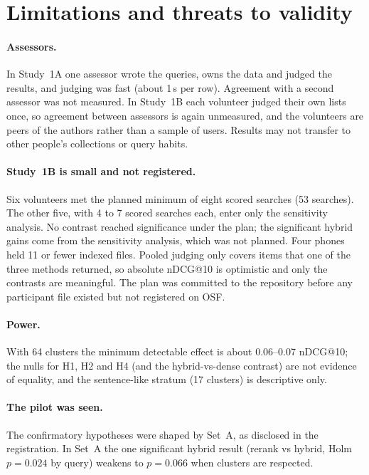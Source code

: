 \documentclass[11pt,a4paper]{article}
\makeatletter
\newcommand{\ndcg}{nDCG@10}
\makeatother
\begin{document}
\section{Limitations and threats to validity}\label{sec:limits}

\paragraph{Assessors.} In Study~1A one assessor wrote the queries, owns the data and judged the results, and judging was fast (about 1\,s per row). Agreement with a second assessor was not measured. In Study~1B each volunteer judged their own lists once, so agreement between assessors is again unmeasured, and the volunteers are peers of the authors rather than a sample of users. Results may not transfer to other people's collections or query habits.

\paragraph{Study~1B is small and not registered.} Six volunteers met the planned minimum of eight scored searches (53 searches). The other five, with 4 to 7 scored searches each, enter only the sensitivity analysis. No contrast reached significance under the plan; the significant hybrid gains come from the sensitivity analysis, which was not planned. Four phones held 11 or fewer indexed files. Pooled judging only covers items that one of the three methods returned, so absolute \ndcg{} is optimistic and only the contrasts are meaningful. The plan was committed to the repository before any participant file existed but not registered on OSF.

\paragraph{Power.} With 64 clusters the minimum detectable effect is about 0.06--0.07 \ndcg{}; the nulls for H1, H2 and H4 (and the hybrid-vs-dense contrast) are not evidence of equality, and the sentence-like stratum (17 clusters) is descriptive only.

\paragraph{The pilot was seen.} The confirmatory hypotheses were shaped by Set~A, as disclosed in the registration. In Set~A the one significant hybrid result (rerank vs hybrid, Holm $p=0.024$ by query) weakens to $p=0.066$ when clusters are respected.
\end{document}

